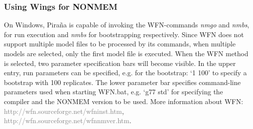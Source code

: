 \documentclass[a4,11pt]{report} \usepackage[pdftex]{graphicx}
\begin{document}
\subsubsection*{Using Wings for NONMEM} On Windows, Pira\~na is
capable of invoking the WFN-commands \emph{nmgo} and \emph{nmbs}, for
run execution and \emph{nmbs} for bootstrapping respectively. Since
WFN does not support multiple model files to be processed by its
commands, when multiple models are selected, only the first model file
is executed. When the WFN method is selected, two parameter
specification bars will become visible. In the upper entry, run
parameters can be specified, e.g. for the bootstrap: `1 100' to
specify a bootstrap with 100 replicates. The lower parameter bar
specifies command-line parameters used when starting WFN.bat,
e.g. `g77 std' for specifying the compiler and the NONMEM version to
be used. More information about WFN:
\textcolor{Grey}{http://wfn.sourceforge.net/wfninst.htm},
\textcolor{Grey}{http://wfn.sourceforge.net/wfnnmver.htm}.
\end{document}

